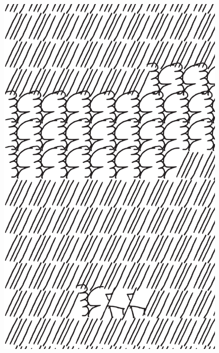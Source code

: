 \makeatletter\@openrightfalse
\movetooddpage
\begin{absolutelynopagebreak}
\begin{vplace}
\begin{figure}[H]
\begin{adjustwidth}{-0.99cm}{}
  \centering
  \vspace*{-1.77cm}
  \includegraphics[width=110mm]{./imgs/img6.pdf}  
  \hfill
\end{adjustwidth}

\thispagestyle{empty}

\end{figure}
\end{vplace}

\end{absolutelynopagebreak}


